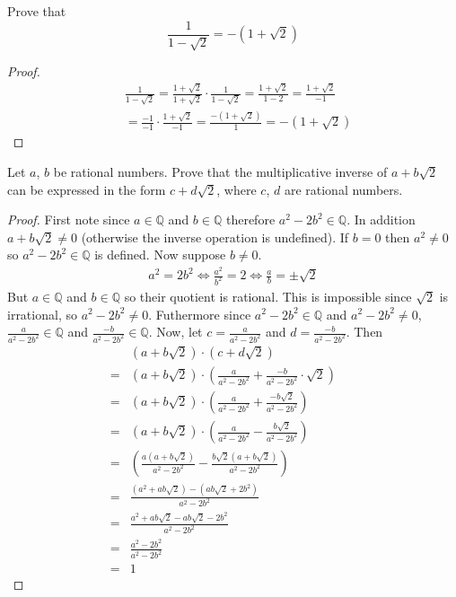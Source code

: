 \begin{tcolorbox}[title=Problem 5, breakable]
    Prove that 
    \[\frac{1}{1 - \sqrt{2}} = -(1 + \sqrt{2})\]
\end{tcolorbox}

\begin{proof}
    \begin{align*}
        &\frac{1}{1 - \sqrt{2}}
        = \frac{1 + \sqrt{2}}{1 + \sqrt{2}} \cdot \frac{1}{1 - \sqrt{2}}
        = \frac{1 + \sqrt{2}}{1 - 2}
        = \frac{1 + \sqrt{2}}{-1} \\
        &= \frac{-1}{-1} \cdot \frac{1 + \sqrt{2}}{-1} 
        = \frac{-(1 + \sqrt{2})}{1}
        = -(1 + \sqrt{2}) 
    \end{align*}
\end{proof}

\begin{tcolorbox}[title=Problem 8, breakable]
    Let $a$, $b$ be rational numbers. Prove that the multiplicative inverse of 
    $a + b\sqrt{2}$ can be expressed in the form $c + d\sqrt{2}$, where $c$, $d$
    are rational numbers.
\end{tcolorbox}

\begin{proof}
    First note since $a \in \mathbb{Q}$ and $b \in \mathbb{Q}$ therefore $a^2 - 2b^2 \in \mathbb{Q}$.
    In addition $a + b\sqrt{2} \not = 0$ (otherwise the inverse operation is undefined).
    If $b = 0$ then $a^2 \not = 0$ so $a^2 - 2b^2 \in \mathbb{Q}$ is defined.
    Now suppose $b \not = 0$.
    \begin{align*}
        a^2 = 2b^2 \iff \frac{a^2}{b^2} = 2 \iff \frac{a}{b} = \pm \sqrt{2}
    \end{align*}
    But $a \in \mathbb{Q}$ and $b \in \mathbb{Q}$ so their quotient is rational.
    This is impossible since $\sqrt{2}$ is irrational, so $a^2 - 2b^2 \neq 0$.
    Futhermore since $a^2 - 2b^2 \in \mathbb{Q}$ and $a^2 - 2b^2 \not = 0$,
        $\frac{a}{a^2 - 2b^2} \in \mathbb{Q}$ and $\frac{-b}{a^2 - 2b^2} \in \mathbb{Q}$.
    Now, let $c = \frac{a}{a^2 - 2b^2}$ and $d = \frac{-b}{a^2 - 2b^2}$.
    Then
    \begin{align*}
        & (a + b\sqrt{2}) \cdot (c + d\sqrt{2}) && \\
        = &(a + b\sqrt{2}) \cdot \left(\frac{a}{a^2 - 2b^2} + \frac{-b}{a^2 - 2b^2} \cdot \sqrt{2}\right) && \\
        = &(a + b\sqrt{2}) \cdot \left(\frac{a}{a^2 - 2b^2} + \frac{-b\sqrt{2}}{a^2 - 2b^2}\right) && \\
        = &(a + b\sqrt{2}) \cdot \left(\frac{a}{a^2 - 2b^2} - \frac{b\sqrt{2}}{a^2 - 2b^2}\right) && \\
        = &\left(\frac{a(a + b\sqrt{2})}{a^2 - 2b^2} - \frac{b\sqrt{2}(a + b\sqrt{2})}{a^2 - 2b^2}\right) && \\
        = &\frac{(a^2 + ab\sqrt{2}) - (ab\sqrt{2} + 2b^2)}{a^2 - 2b^2} && \\
        = &\frac{a^2 + ab\sqrt{2} - ab\sqrt{2} - 2b^2}{a^2 - 2b^2} && \\
        = &\frac{a^2 - 2b^2}{a^2 - 2b^2} && \\
        = &1
    \end{align*}
\end{proof}

